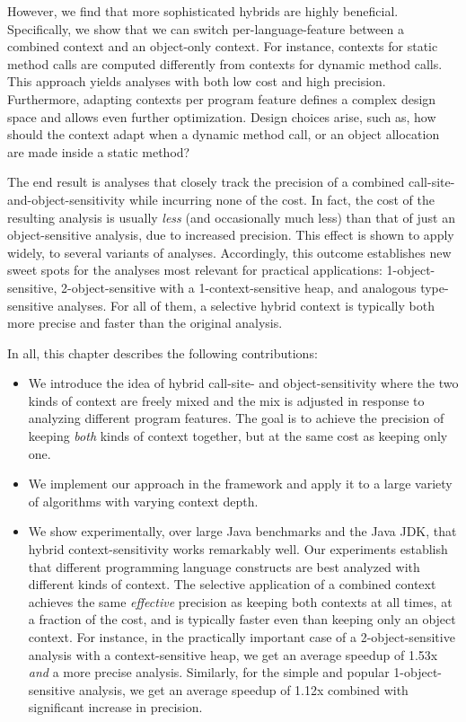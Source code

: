 However, we find that more sophisticated hybrids are highly beneficial. Specifically, we show that we can switch per-language-feature between a combined context and an object-only context. For instance, contexts for static method calls are computed differently from contexts for dynamic method calls. This approach yields analyses with both low cost and high precision. Furthermore, adapting contexts per program feature defines a complex design space and allows even further optimization. Design choices arise, such as, how should the context adapt when a dynamic method call, or an object allocation are made inside a static method?

The end result is analyses that closely track the precision of a combined call-site-and-object-sensitivity while incurring none of the cost. In fact, the cost of the resulting analysis is usually \emph{less} (and occasionally much less) than that of just an object-sensitive analysis, due to increased precision. This effect is shown to apply widely, to several variants of analyses. Accordingly, this outcome establishes new sweet spots for the analyses most relevant for practical applications: 1-object-sensitive, 2-object-sensitive with a 1-context-sensitive heap, and analogous type-sensitive \cite{popl:2011:Smaragdakis} analyses. For all of them, a selective hybrid context is typically both more precise and faster than the original analysis.

In all, this chapter describes the following contributions:

\begin{itemize}
\item We introduce the idea of hybrid call-site- and object-sensitivity where the two kinds of context are freely mixed and the mix is adjusted in response to analyzing different program features. The goal is to achieve the precision of keeping \emph{both} kinds of context together, but at the same cost as keeping only one.

\item We implement our approach in the \doop{} framework and apply it to a large variety of algorithms with varying context depth.

\item We show experimentally, over large Java benchmarks and the Java JDK, that hybrid context-sensitivity works remarkably well. Our experiments establish that different programming language constructs are best analyzed with different kinds of context. The selective application of a combined context achieves the same \emph{effective} precision as keeping both contexts at all times, at a fraction of the cost, and is typically faster even than keeping only an object context. For instance, in the practically important case of a 2-object-sensitive analysis with a context-sensitive heap, we get an average speedup of 1.53x \emph{and} a more precise analysis. Similarly, for the simple and popular 1-object-sensitive analysis, we get an average speedup of 1.12x combined with significant increase in precision.
\end{itemize}


